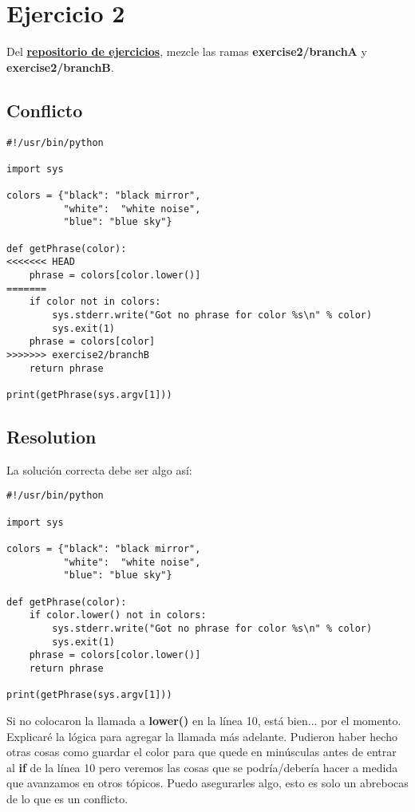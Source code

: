 \section{Ejercicio 2}
\label{exercise_02}
Del \hyperref[exercises_repo]{\bf repositorio de ejercicios}, mezcle las ramas {\bf exercise2/branchA} y {\bf exercise2/branchB}.

\subsection*{Conflicto}
\begin{lstlisting}[style=python_style, caption={\bf Ejercicio 2} - conflicto]
#!/usr/bin/python

import sys

colors = {"black": "black mirror",
          "white":  "white noise",
          "blue": "blue sky"}

def getPhrase(color):
<<<<<<< HEAD
    phrase = colors[color.lower()]
=======
    if color not in colors:
        sys.stderr.write("Got no phrase for color %s\n" % color)
        sys.exit(1)
    phrase = colors[color]
>>>>>>> exercise2/branchB
    return phrase

print(getPhrase(sys.argv[1]))
\end{lstlisting}

\subsection*{Resolution}
La solución correcta debe ser algo así:

\begin{lstlisting}[style=python_style, caption={\bf Ejercicio 2} - resolución]
#!/usr/bin/python

import sys

colors = {"black": "black mirror",
          "white":  "white noise",
          "blue": "blue sky"}

def getPhrase(color):
    if color.lower() not in colors:
        sys.stderr.write("Got no phrase for color %s\n" % color)
        sys.exit(1)
    phrase = colors[color.lower()]
    return phrase

print(getPhrase(sys.argv[1]))
\end{lstlisting}

Si no colocaron la llamada a {\bf lower()} en la línea 10, está bien... por el momento. Explicaré la lógica
para agregar la llamada más adelante. Pudieron haber hecho otras cosas como guardar el color para que quede en minúsculas antes
de entrar al {\bf if} de la línea 10 pero veremos las cosas que se podría/debería hacer a medida que avanzamos en otros tópicos.
Puedo asegurarles algo, esto es solo un abrebocas de lo que es un conflicto.


